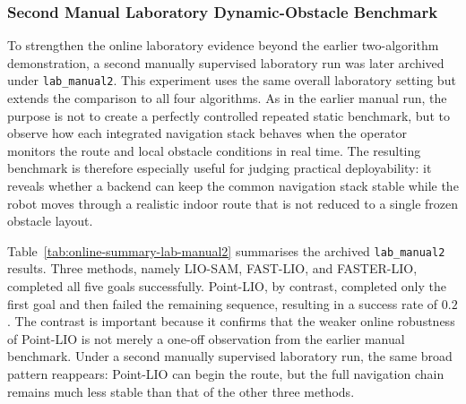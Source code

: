 \documentclass[12pt,a4paper]{report}
\begin{document}
\subsubsection{Second Manual Laboratory Dynamic-Obstacle Benchmark}
To strengthen the online laboratory evidence beyond the earlier two-algorithm demonstration, a second manually supervised laboratory run was later archived under \texttt{lab\_manual2}. This experiment uses the same overall laboratory setting but extends the comparison to all four algorithms. As in the earlier manual run, the purpose is not to create a perfectly controlled repeated static benchmark, but to observe how each integrated navigation stack behaves when the operator monitors the route and local obstacle conditions in real time. The resulting benchmark is therefore especially useful for judging practical deployability: it reveals whether a backend can keep the common navigation stack stable while the robot moves through a realistic indoor route that is not reduced to a single frozen obstacle layout.

Table~\ref{tab:online-summary-lab-manual2} summarises the archived \texttt{lab\_manual2} results. Three methods, namely LIO-SAM, FAST-LIO, and FASTER-LIO, completed all five goals successfully. Point-LIO, by contrast, completed only the first goal and then failed the remaining sequence, resulting in a success rate of \(0.2\). The contrast is important because it confirms that the weaker online robustness of Point-LIO is not merely a one-off observation from the earlier manual benchmark. Under a second manually supervised laboratory run, the same broad pattern reappears: Point-LIO can begin the route, but the full navigation chain remains much less stable than that of the other three methods.

\begin{table}[H]
\centering
\scriptsize
\caption{Second manual indoor laboratory online benchmark (\texttt{lab\_manual2}) across all four algorithms.}
\label{tab:online-summary-lab-manual2}
\setlength{\tabcolsep}{3pt}
\renewcommand{\arraystretch}{1.05}
\end{table}
\end{document}
